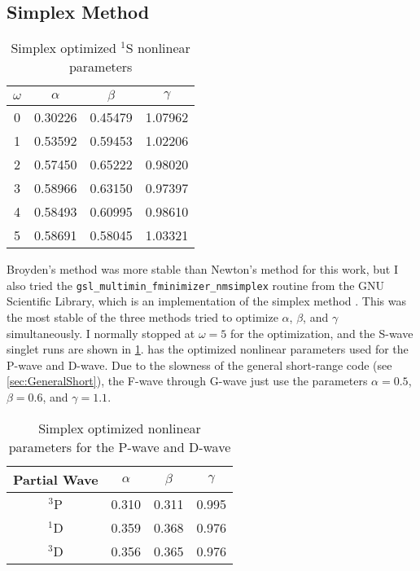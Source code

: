 \documentclass[Dissertation.tex]{subfiles}
\begin{document}
\subsection{Simplex Method}
\label{sec:Simplex}

\begin{table}
\centering
\begin{tabular}{c c c c}
\toprule
$\omega$ & $\alpha$ & $\beta$ & $\gamma$ \\ [0.5ex]
\midrule
0 & 0.30226 & 0.45479 & 1.07962 \\
1 & 0.53592 & 0.59453 & 1.02206 \\
2 & 0.57450 & 0.65222 & 0.98020 \\
3 & 0.58966 & 0.63150 & 0.97397 \\
4 & 0.58493 & 0.60995 & 0.98610 \\
5 & 0.58691 & 0.58045 & 1.03321 \\
\bottomrule
\end{tabular}
\caption{Simplex optimized $^1$S nonlinear parameters}
\label{tab:NonlinearOptimized1SSimplex}
\end{table}

Broyden's method was more stable than Newton's method for this work, but I 
also tried the \texttt{gsl\_multimin\_fminimizer\_nmsimplex} routine from the 
GNU Scientific Library, which is an implementation of the simplex method
\cite{GSL,GSLsimplex}. This was the most stable of the three methods tried to 
optimize $\alpha$, $\beta$, and $\gamma$ simultaneously. I normally stopped 
at $\omega = 5$ for the optimization, and the S-wave singlet runs are shown 
in \cref{tab:NonlinearOptimized1SSimplex}.  
has the optimized nonlinear parameters used for the P-wave and D-wave. Due to 
the slowness of the general short-range code (see \cref{sec:GeneralShort}), 
the F-wave through G-wave just use the parameters $\alpha = 0.5$, $\beta = 0.6$,
and $\gamma = 1.1$.

\begin{table}
\small
\centering
\begin{tabular}{c c c c}
\toprule
Partial Wave & $\alpha$ & $\beta$ & $\gamma$ \\
\midrule
$^3$P & 0.310 & 0.311 & 0.995 \\
$^1$D & 0.359 & 0.368 & 0.976 \\
$^3$D & 0.356 & 0.365 & 0.976 \\
\bottomrule
\end{tabular}
\caption{Simplex optimized nonlinear parameters for the P-wave and D-wave}
\label{tab:NonlinearOptimizedPD}
\end{table}
\end{document}
